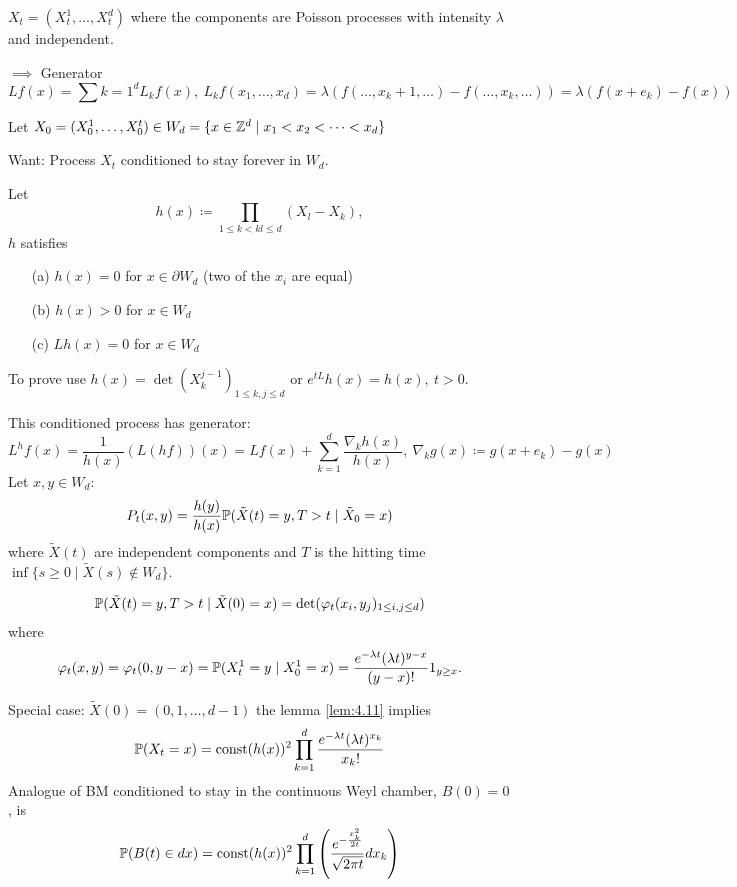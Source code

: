 $X_t=(X_t^1,\dots,X_t^d)$ where the components are Poisson processes with intensity $\lambda$ and independent.

$\implies$ Generator 
\[Lf(x)=\sum{k=1}^d L_kf(x),\ L_k f(x_1,\dots,x_d)=\lambda(f(\dots,x_k+1,\dots)-f(\dots,x_k,\dots))=\lambda(f(x+e_k)-f(x))\]

Let $X_0=(X_0^1,\dots,X_0^t)\in W_d=\{x\in \mathbb{Z}^d\mid x_1<x_2<\dots<x_d\}$

Want: Process $X_t$ conditioned to stay forever in $W_d$.


\begin{lemma}\label{lem:4.10}
    Let \[h(x)\coloneqq \prod_{1\leq k<kl\leq d} (X_l-X_k),\]
    $h$ satisfies 
    \begin{enumerate}
        \item[(a)] $h(x)=0$ for $x\in \partial W_d$ (two of the $x_i$ are equal)
        \item[(b)] $h(x)>0$  for $x \in W_d$
        \item[(c)] $Lh(x)=0$ for $x\in W_d$  
    \end{enumerate}
\end{lemma}

\begin{remark}
    To prove use $h(x)=\det(X_k^{j-1})_{1\leq k,j\leq d}$ or $e^{tL}h(x)=h(x),\ t>0$.
\end{remark}

This conditioned process has generator:
\[L^h f(x)=\frac{1}{h(x)}(L(hf))(x)=Lf(x)+\sum_{k=1}^d\frac{\nabla_k h(x)}{h(x)},\ \nabla_k g(x)\coloneqq g(x+e_k)-g(x)\]
Let $x,y\in W_d$:\begin{align*}
    P_t(x,y)=\frac{h(y)}{h(x)}\mathbb{P}(\tilde{X}(t)=y,T>t\mid \tilde{X}_0=x)
\end{align*}
where $\tilde{X}(t)$ are independent components and $T$ is the hitting time $\inf\{s\geq 0\mid \tilde{X}(s)\notin W_d\}$.

\begin{lemma}\label{lem:4.11}
    \begin{align*}
        \mathbb{P}(\tilde{X}(t)=y,T>t\mid \tilde{X}(0)=x)=\det(\varphi_t(x_i,y_j)_{1\leq i,j\leq d})
    \end{align*}    
    where 
    \[\varphi_t(x,y)=\varphi_t(0,y-x)=\mathbb{P}(X_t^1=y\mid X_0^1=x)=\frac{e^{-\lambda t}(\lambda t)^{y-x}}{(y-x)!}1_{y\geq x}.\]
\end{lemma}

Special case: $\tilde{X}(0)=(0,1,\dots,d-1)$ the lemma \ref{lem:4.11} implies 
\[\mathbb{P}(X_t=x)=\text{const}(h(x))^2\prod_{k=1}^d \frac{e^{-\lambda t}(\lambda t)^{x_k}}{x_k!}\]
Analogue of BM conditioned to stay in the continuous Weyl chamber, $B(0)=0$, is 
\[\mathbb{P}(B(t)\in dx)=\text{const} (h(x))^2\prod_{k=1}^d\left(\frac{e^{-\frac{x_k^2}{2t}}}{\sqrt{2\pi t}}dx_k\right)\]

